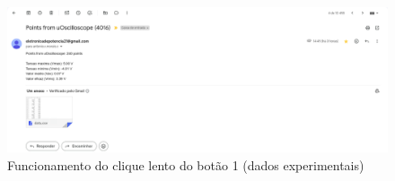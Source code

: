 \begin{figure}[H]
    \centering
    \includegraphics[width=1\textwidth]{Apêndices/Botão 12.png}
    \captionsetup{justification=centering}
    \caption{Funcionamento do clique lento do botão 1 (dados experimentais)}
    \label{fig:Funcionamento do clique lento  do botão 1 (dados experimentais)}
\end{figure}